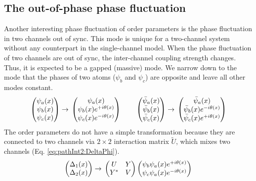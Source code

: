 \subsection{The out-of-phase phase fluctuation}
Another interesting phase fluctuation of order parameters is the  phase fluctuation in two channels out of sync.  This mode is unique for a two-channel system without any counterpart in the single-channel model.  When  the phase fluctuation of two channels are out of  sync,  the inter-channel coupling strength changes.  Thus, it is  expected to be  a gapped (massive) mode.  We narrow down to the mode that the phases of two atoms  ($\psi_{b}$ and $\psi_{c}$) are opposite and leave all other modes constant.  
\begin{equation*}
\begin{pmatrix}\psi_{a}(x)\\\psi_{b}(x)\\\psi_{c}(x)\end{pmatrix}\rightarrow{}
	\begin{pmatrix}\psi_{a}(x)\\\psi_{b}(x)e^{+i\theta(x)}\\\psi_{c}(x)e^{-i\theta(x)}\end{pmatrix}
\qquad{}
\begin{pmatrix}\bar\psi_{a}(x)\\\bar\psi_{b}(x)\\\bar\psi_{c}(x)\end{pmatrix}\rightarrow{}
	\begin{pmatrix}\bar\psi_{a}(x)\\\bar\psi_{b}(x)e^{-i\theta(x)}\\\bar\psi_{c}(x)e^{+i\theta(x)}\end{pmatrix}
\end{equation*}
The order parameters do not have a simple transformation because they are connected to two channels via $2\times2$ interaction matrix $\tilde{U}$, which mixes two channels (Eq. \ref{eq:pathInt2:DeltaPhi}).  
\begin{equation*}
\begin{pmatrix}\Delta_{1}(x)\\\Delta_{2}(x)\end{pmatrix}\rightarrow{}
	\begin{pmatrix}U&Y\\Y^{*}&V\end{pmatrix}\begin{pmatrix}\psi_{b}\psi_{a}(x)e^{+i\theta(x)}\\\psi_{c}\psi_{a}(x)e^{-i\theta(x)}\end{pmatrix}
\end{equation*}
